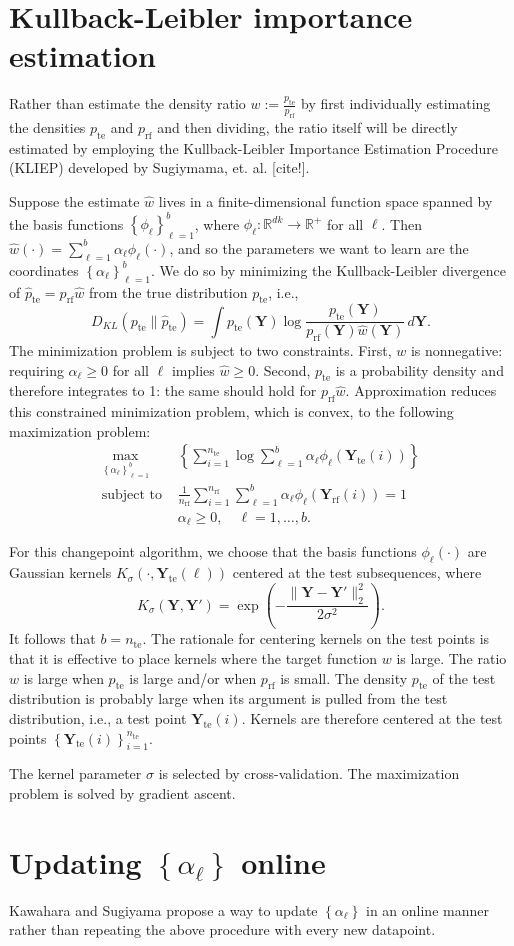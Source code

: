 \documentclass[12pt]{article}
\newcommand\prn[1]{\left( #1 \right)}
\newcommand\set[1]{\left\{ #1 \right\}}
\newcommand\RR{\mathbb{R}}
\newcommand\YY{\boldsymbol{Y}}
\newcommand\rf{{\mathrm{rf}}}
\newcommand\te{{\mathrm{te}}}
\begin{document}
\section{Kullback-Leibler importance estimation}

Rather than estimate the density ratio $w:=\frac{p_\te}{p_\rf}$ by first individually estimating the densities $p_\te$ and $p_\rf$ and then dividing, the ratio itself will be directly estimated by employing the Kullback-Leibler Importance Estimation Procedure (KLIEP) developed by Sugiymama, et. al. [cite!].

Suppose the estimate $\hat w$ lives in a finite-dimensional function space spanned by the basis functions $\set{\phi_\ell}_{\ell=1}^b$,  where $\phi_\ell\colon\RR^{dk}\to\RR^+$ for all $\ell$. Then $\hat w(\cdot)=\sum_{\ell=1}^b\alpha_\ell\phi_\ell(\cdot)$, and so the parameters we want to learn are the coordinates $\set{\alpha_\ell}_{\ell=1}^b$. We do so by minimizing the Kullback-Leibler divergence of $\hat p_\te=p_\rf\hat w$ from the true distribution $p_\te$, i.e.,
$$D_{KL}(p_\te\|\hat p_\te)=\int p_\te(\YY)\log\frac{p_\te(\YY)}{p_\rf(\YY)\hat w(\YY)}\,d\YY.$$
The minimization problem is subject to two constraints. First, $w$ is nonnegative: requiring $\alpha_\ell\ge0$ for all $\ell$ implies $\hat w\ge0$. Second, $p_\te$ is a probability density and therefore integrates to 1: the same should hold for $p_\rf\hat w$. Approximation reduces this constrained minimization problem, which is convex, to the following maximization problem:
\begin{align*}
  \max_{\set{\alpha_\ell}_{\ell=1}^b}&\set{\sum_{i=1}^{n_\te}\log\sum_{\ell=1}^b\alpha_\ell\phi_\ell(\YY_\te(i))}\\
  \text{subject to }&\frac{1}{n_\rf}\sum_{i=1}^{n_\rf}\sum_{\ell=1}^b\alpha_\ell\phi_\ell(\YY_\rf(i))=1\\
  &\alpha_\ell\ge0,\quad\ell=1,\ldots,b.
\end{align*}

For this changepoint algorithm, we choose that the basis functions $\phi_\ell(\cdot)$ are Gaussian kernels $K_\sigma(\cdot,\YY_\te(\ell))$ centered at the test subsequences, where
$$K_\sigma(\YY,\YY')=\exp\prn{-\frac{\|\YY-\YY'\|_2^2}{2\sigma^2}}.$$
It follows that $b=n_\te$. The rationale for centering kernels on the test points is that it is effective to place kernels where the target function $w$ is large. The ratio $w$ is large when $p_\te$ is large and/or when $p_\rf$ is small. The density $p_\te$ of the test distribution is probably large when its argument is pulled from the test distribution, i.e., a test point $\YY_\te(i)$. Kernels are therefore centered at the test points $\set{\YY_\te(i)}_{i=1}^{n_\te}$.

The kernel parameter $\sigma$ is selected by cross-validation. The maximization problem is solved by gradient ascent.

\section{Updating $\set{\alpha_\ell}$ online}

Kawahara and Sugiyama propose a way to update $\set{\alpha_\ell}$ in an online manner rather than repeating the above procedure with every new datapoint.
\end{document}
